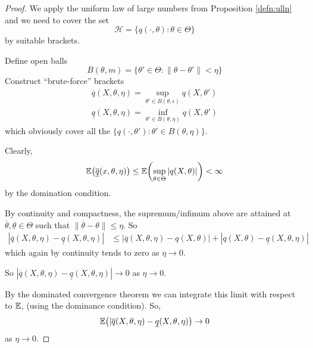 \begin{proof}
  We apply the uniform law of large numbers from Proposition
  \ref{defn:ulln}  and we need to cover the set
  \begin{equation}
    \label{eq:52}
    \mathcal{H} = \{ q(\cdot, \theta) : \theta \in \Theta \}
  \end{equation} by suitable brackets.

  Define open balls
  \begin{equation}
    \label{eq:53}
    B(\theta, m) = \{ \theta' \in \Theta: \| \theta -  \theta' \| <
    \eta \}
  \end{equation}
  Construct ``brute-force'' brackets
  \begin{align}
    \label{eq:54} \overline q(X, \theta, \eta) = \sup_{\theta' \in
      B(\theta, \epsilon)} q(X, \theta') \\ \underline q(X, \theta,
    \eta) = \inf_{\theta' \in B(\theta, \eta)} q(X, \theta')
  \end{align} which obviously cover all the $\{ q(\cdot, \theta') :
  \theta' \in B(\theta, \eta) \}$.

  Clearly,
  \begin{align}
    \label{eq:55} \E{\overline{\underline q}(x, \theta, \eta)} \leq
    \E{\sup_{\theta \in \Theta} | q(X, \theta) |} < \infty
  \end{align} by the domination condition.

  By continuity and compactness, the supremum/infimum above are
  attained at $\overline \theta, \underline \theta \in \Theta$ such
  that $\| \overline \theta - \theta \| \leq \eta$. So
  \begin{align}
    \label{eq:56} | \overline q (X, \theta, \eta) - \underline q(X,
    \theta, \eta) | &\leq | \overline q(X, \theta, \eta) - q(X,
    \theta) | + | q(X, \theta) - \underline q (X, \theta, \eta) |
  \end{align} which again by continuity tends to zero as $\eta
  \rightarrow 0$.

  So $| \overline q(X, \theta, \eta) - \underline q(X, \theta, \eta)|
  \rightarrow 0$ as $\eta \rightarrow 0$.

  By the dominated convergence theorem we can integrate this limit with
  respect to $\E$, (using the dominance condition).  So,
  \begin{equation}
    \label{eq:57}
    \E{|\overline q(X, \theta, \eta) - \underline q(X, \theta, \eta)}
    \rightarrow 0
  \end{equation} as $\eta \rightarrow 0$.


\end{proof}
